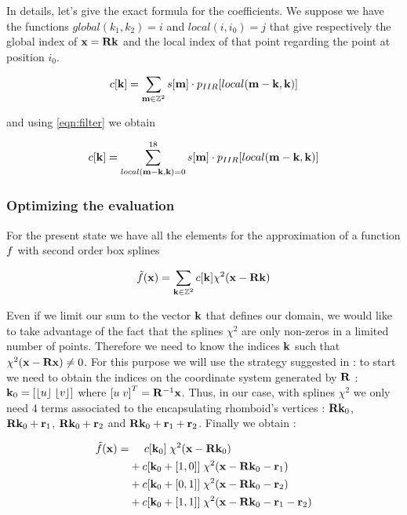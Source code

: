 \documentclass[11pt,a4paper]{amsart}
\begin{document}
In details, let's give the exact formula for the coefficients. We suppose we have the functions $global(k_1, k_2) = i$ and $local(i,i_0) = j$ that give respectively the global index of $\mathbf{x} = \mathbf{R} \mathbf{k}$ and the local index of that point regarding the point at position $i_0$.

\begin{equation}
c[\mathbf{k}] = \sum_{\mathbf{m} \in \mathbb{Z}^2} s[\mathbf{m}] \cdot p_{IIR}[local(\mathbf{m} - \mathbf{k}, \mathbf{k})]
\end{equation}

and using \eqref{eqn:filter} we obtain

\begin{align}
\label{eqn:coef_algo}
c[\mathbf{k}] = \sum_{local(\mathbf{m} - \mathbf{k}, \mathbf{k}) = 0}^{18} s[\mathbf{m}] \cdot p_{IIR}[local(\mathbf{m} - \mathbf{k}, \mathbf{k})]
\end{align}





\subsubsection{Optimizing the evaluation}

For the present state we have all the elements for the approximation of a function $f$ with second order box splines

\begin{equation}
\tilde{f}(\mathbf{x}) = \sum_{\mathbf{k} \in \mathbb{Z}^2} c[\mathbf{k}] \chi^2(\mathbf{x} - \mathbf{R}\mathbf{k})
\end{equation}

Even if we limit our sum to the vector $\mathbf{k}$ that defines our domain, we would like to take advantage of the fact that the splines $\chi^2$ are only non-zeros in a limited number of points. Therefore we need to know the indices $\mathbf{k}$ such that $\chi^2(\mathbf{x} - \mathbf{R} \mathbf{x}) \neq 0$. For this purpose we will use the strategy suggested in \cite{Condat2007} : to start we need to obtain the indices on the coordinate system generated by $\mathbf{R}$ : $\mathbf{k}_0 = \left[ \lfloor u \rfloor \; \lfloor v \rfloor \right]$ where $\left[ u \; v \right]^T = \mathbf{R}^ {-1} \mathbf{x} $. Thus, in our case, with splines $\chi^2$ we only need 4 terms associated to the encapsulating rhomboid's vertices : $\mathbf{R}\mathbf{k}_0$, $\mathbf{R}\mathbf{k}_0 + \mathbf{r}_1$, $\mathbf{R}\mathbf{k}_0 + \mathbf{r}_2$ and $\mathbf{R}\mathbf{k}_0 + \mathbf{r}_1 + \mathbf{r}_2$. Finally we obtain :

\begin{align}
\label{eqn:chi2_fct_interpol}
\tilde{f}(\mathbf{x}) =& \;\;\;\;\; c[\mathbf{k}_0] \; \chi^2(\mathbf{x} - \mathbf{R}\mathbf{k}_0) \nonumber\\
	&+ c[\mathbf{k}_0 +[1,0]]\; \chi^2(\mathbf{x} - \mathbf{R}\mathbf{k}_0 - \mathbf{r}_1) \nonumber\\
	&+ c[\mathbf{k}_0 +[0,1]]\; \chi^2(\mathbf{x} - \mathbf{R}\mathbf{k}_0 - \mathbf{r}_2) \nonumber\\
	&+ c[\mathbf{k}_0 +[1,1]]\; \chi^2(\mathbf{x} - \mathbf{R}\mathbf{k}_0 - \mathbf{r}_1 - \mathbf{r}_2)
\end{align}
\end{document}
